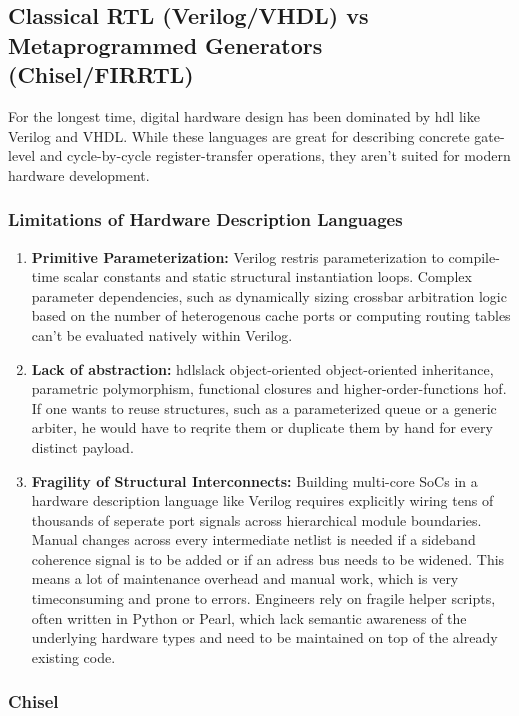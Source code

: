 \subsection{Classical RTL (Verilog/VHDL) vs Metaprogrammed Generators (Chisel/FIRRTL)}

For the longest time, digital hardware design has been dominated by \gls{hdl} like Verilog and VHDL.
While these languages are great for describing concrete gate-level and cycle-by-cycle register-transfer operations,
they aren't suited for modern hardware development.

\subsubsection{Limitations of Hardware Description Languages}

\begin{enumerate}
  \item \textbf{Primitive Parameterization:} Verilog restris parameterization to compile-time scalar constants and static structural instantiation loops.
    Complex parameter dependencies, such as dynamically sizing crossbar arbitration logic based on the number of heterogenous cache ports or computing routing tables can't be evaluated natively within Verilog.
  \item \textbf{Lack of abstraction:} \glspl{hdl}lack object-oriented object-oriented inheritance, parametric polymorphism, functional closures and higher-order-functions \gls{hof}. 
    If one wants to reuse structures, such as a parameterized queue or a generic arbiter, he would have to reqrite them or duplicate them by hand for every distinct payload.
  \item \textbf{Fragility of Structural Interconnects:} Building multi-core SoCs in a hardware description language like Verilog requires explicitly wiring tens of thousands of seperate port signals across hierarchical module boundaries.
    Manual changes across every intermediate netlist is needed if a sideband coherence signal is to be added or if an adress bus needs to be widened.
    This means a lot of maintenance overhead and manual work, which is very timeconsuming and prone to errors.
    Engineers rely on fragile helper scripts, often written in Python or Pearl, 
    which lack semantic awareness of the underlying hardware types and need to be maintained on top of the already existing code.
\end{enumerate}

\subsubsection{Chisel}

